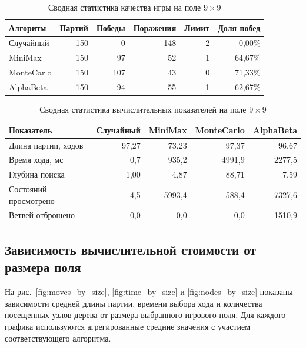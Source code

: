 \documentclass[a4paper,12pt]{diplom}
\newcommand{\goodcell}[1]{\cellcolor{WinHigh}#1}
\newcommand{\midcell}[1]{\cellcolor{WinMid}#1}
\newcommand{\badcell}[1]{\cellcolor{WinLow}#1}
\newcommand{\neutralcell}[1]{\cellcolor{MetricNeutral}#1}
\begin{document}
\begin{table}[H]
\centering
\caption{Сводная статистика качества игры на поле $9\times9$}
\label{tab:summary_quality_9}
\begin{tabular}{lrrrrr}
\toprule
Алгоритм & Партий & Победы & Поражения & Лимит & Доля побед \\
\midrule
Случайный  & \neutralcell{150} & \badcell{0}   & \badcell{148} & \midcell{2} & \badcell{0,00\%} \\
MiniMax    & \neutralcell{150} & \midcell{97}  & \midcell{52}  & \goodcell{1} & \midcell{64,67\%} \\
MonteCarlo & \neutralcell{150} & \goodcell{107} & \goodcell{43} & \neutralcell{0} & \goodcell{71,33\%} \\
AlphaBeta  & \neutralcell{150} & \midcell{94}  & \midcell{55}  & \goodcell{1} & \midcell{62,67\%} \\
\bottomrule
\end{tabular}
\end{table}

\begin{table}[H]
\centering
\caption{Сводная статистика вычислительных показателей на поле $9\times9$}
\label{tab:summary_cost_9}
\begin{tabular}{lrrrr}
\toprule
Показатель & Случайный & MiniMax & MonteCarlo & AlphaBeta \\
\midrule
Длина партии, ходов & \badcell{97,27} & \goodcell{73,23} & \badcell{97,37} & \badcell{96,67} \\
Время хода, мс & \goodcell{0,7} & \goodcell{935,2} & \badcell{4991,9} & \midcell{2277,5} \\
Глубина поиска & \badcell{1,00} & \midcell{4,87} & \goodcell{88,71} & \midcell{7,59} \\
Состояний просмотрено & \goodcell{4,5} & \midcell{5993,4} & \goodcell{588,4} & \badcell{7327,6} \\
Ветвей отброшено & \neutralcell{0,0} & \neutralcell{0,0} & \neutralcell{0,0} & \goodcell{1510,9} \\
\bottomrule
\end{tabular}
\end{table}

\subsection{Зависимость вычислительной стоимости от размера поля}

На рис.~\ref{fig:moves_by_size}, \ref{fig:time_by_size} и \ref{fig:nodes_by_size} показаны зависимости средней длины партии, времени выбора хода и количества посещенных узлов дерева от размера выбранного игрового поля. Для каждого графика используются агрегированные средние значения с участием соответствующего алгоритма.
\end{document}
